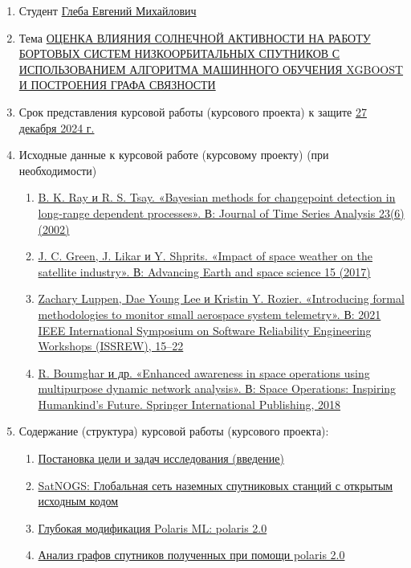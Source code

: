 \documentclass[14pt, a4paper]{extreport}
\begin{document}
\noindent
\begin{enumerate}
	\item {Студент} \uline{Глеба Евгений Михайлович}
	\item {Тема} \uline{ОЦЕНКА ВЛИЯНИЯ СОЛНЕЧНОЙ АКТИВНОСТИ НА РА\-БО\-ТУ БОРТОВЫХ СИСТЕМ НИЗКООРБИТАЛЬНЫХ СПУ\-ТНИ\-КОВ С ИСПОЛЬЗОВАНИЕМ АЛГОРИТМА МАШИННОГО ОБУ\-ЧЕ\-НИЯ XGBOOST И ПОСТРОЕНИЯ ГРАФА СВЯЗНОСТИ}
	\item {Срок представления курсовой работы (курсового проекта) к защите} \underline{27 декабря 2024 г.}
	\item {Исходные данные к курсовой работе (курсовому проекту)} (при необходимости)
	      \begin{enumerate}[label=\arabic{enumi}.\arabic*]
		      \item \uline{B. K. Ray и R. S. Tsay. «Bayesian methods for changepoint detection in long-range dependent processes». В: Journal of Time Series Analysis 23(6) (2002)}
		      \item \uline{J. C. Green, J. Likar и Y. Shprits. «Impact of space weather on the satellite
			            industry». В: Advancing Earth and space science 15 (2017)}
		      \item \uline{Zachary Luppen, Dae Young Lee и Kristin Y. Rozier. «Introducing formal methodologies to monitor small aerospace system telemetry». В: 2021 IEEE International Symposium on Software Reliability Engi\-nee\-ring Workshops (ISSREW), 15--22}
		      \item \uline{R. Boumghar и др. «Enhanced awareness in space operations using multipurpose dynamic network analysis». В: Space Operations: Inspi\-ring Humankind’s Future. Springer International Publishing, 2018}
	      \end{enumerate}
	\item {Содержание (структура) курсовой работы (курсового проекта):}
	      \begin{enumerate}[label=\arabic{enumi}.\arabic*]
		      \item \uline{Постановка цели и задач исследования (введение)}
		      \item \uline{SatNOGS: Глобальная сеть наземных спутниковых станций с откры\-тым исходным кодом}
		      \item \uline{Глубокая модификация Polaris ML: polaris 2.0}
		      \item \uline{Анализ графов спутников полученных при помощи polaris 2.0}
	      \end{enumerate}
\end{enumerate}
\end{document}
